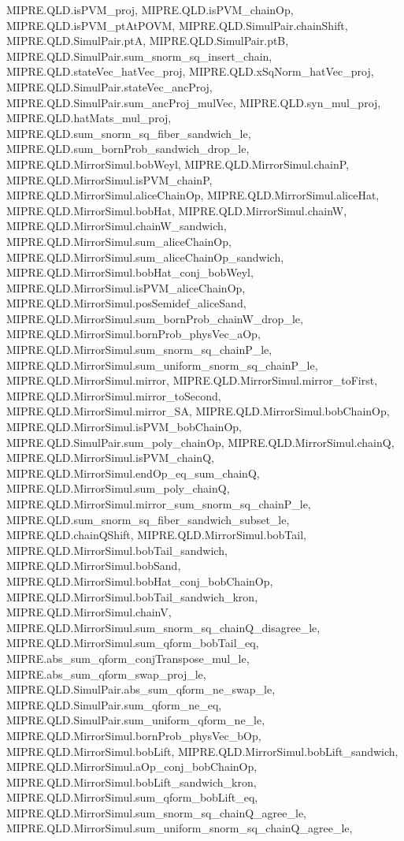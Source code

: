 \begin{lemma}
{  MIPRE.QLD.isPVM_proj, MIPRE.QLD.isPVM_chainOp, MIPRE.QLD.isPVM_ptAtPOVM,
  MIPRE.QLD.SimulPair.chainShift, MIPRE.QLD.SimulPair.ptA, MIPRE.QLD.SimulPair.ptB,
  MIPRE.QLD.SimulPair.sum_snorm_sq_insert_chain, MIPRE.QLD.stateVec_hatVec_proj,
  MIPRE.QLD.xSqNorm_hatVec_proj, MIPRE.QLD.SimulPair.stateVec_ancProj,
  MIPRE.QLD.SimulPair.sum_ancProj_mulVec, MIPRE.QLD.syn_mul_proj, MIPRE.QLD.hatMats_mul_proj,
  MIPRE.QLD.sum_snorm_sq_fiber_sandwich_le, MIPRE.QLD.sum_bornProb_sandwich_drop_le,
  MIPRE.QLD.MirrorSimul.bobWeyl, MIPRE.QLD.MirrorSimul.chainP, MIPRE.QLD.MirrorSimul.isPVM_chainP,
  MIPRE.QLD.MirrorSimul.aliceChainOp, MIPRE.QLD.MirrorSimul.aliceHat, MIPRE.QLD.MirrorSimul.bobHat,
  MIPRE.QLD.MirrorSimul.chainW, MIPRE.QLD.MirrorSimul.chainW_sandwich,
  MIPRE.QLD.MirrorSimul.sum_aliceChainOp, MIPRE.QLD.MirrorSimul.sum_aliceChainOp_sandwich,
  MIPRE.QLD.MirrorSimul.bobHat_conj_bobWeyl, MIPRE.QLD.MirrorSimul.isPVM_aliceChainOp,
  MIPRE.QLD.MirrorSimul.posSemidef_aliceSand, MIPRE.QLD.MirrorSimul.sum_bornProb_chainW_drop_le,
  MIPRE.QLD.MirrorSimul.bornProb_physVec_aOp, MIPRE.QLD.MirrorSimul.sum_snorm_sq_chainP_le,
  MIPRE.QLD.MirrorSimul.sum_uniform_snorm_sq_chainP_le, MIPRE.QLD.MirrorSimul.mirror,
  MIPRE.QLD.MirrorSimul.mirror_toFirst, MIPRE.QLD.MirrorSimul.mirror_toSecond,
  MIPRE.QLD.MirrorSimul.mirror_SA, MIPRE.QLD.MirrorSimul.bobChainOp,
  MIPRE.QLD.MirrorSimul.isPVM_bobChainOp, MIPRE.QLD.SimulPair.sum_poly_chainOp,
  MIPRE.QLD.MirrorSimul.chainQ, MIPRE.QLD.MirrorSimul.isPVM_chainQ,
  MIPRE.QLD.MirrorSimul.endOp_eq_sum_chainQ, MIPRE.QLD.MirrorSimul.sum_poly_chainQ,
  MIPRE.QLD.MirrorSimul.mirror_sum_snorm_sq_chainP_le,
  MIPRE.QLD.sum_snorm_sq_fiber_sandwich_subset_le, MIPRE.QLD.chainQShift,
  MIPRE.QLD.MirrorSimul.bobTail, MIPRE.QLD.MirrorSimul.bobTail_sandwich,
  MIPRE.QLD.MirrorSimul.bobSand, MIPRE.QLD.MirrorSimul.bobHat_conj_bobChainOp,
  MIPRE.QLD.MirrorSimul.bobTail_sandwich_kron, MIPRE.QLD.MirrorSimul.chainV,
  MIPRE.QLD.MirrorSimul.sum_snorm_sq_chainQ_disagree_le, MIPRE.QLD.MirrorSimul.sum_qform_bobTail_eq,
  MIPRE.abs_sum_qform_conjTranspose_mul_le, MIPRE.abs_sum_qform_swap_proj_le,
  MIPRE.QLD.SimulPair.abs_sum_qform_ne_swap_le, MIPRE.QLD.SimulPair.sum_qform_ne_eq,
  MIPRE.QLD.SimulPair.sum_uniform_qform_ne_le, MIPRE.QLD.MirrorSimul.bornProb_physVec_bOp,
  MIPRE.QLD.MirrorSimul.bobLift, MIPRE.QLD.MirrorSimul.bobLift_sandwich,
  MIPRE.QLD.MirrorSimul.aOp_conj_bobChainOp, MIPRE.QLD.MirrorSimul.bobLift_sandwich_kron,
  MIPRE.QLD.MirrorSimul.sum_qform_bobLift_eq, MIPRE.QLD.MirrorSimul.sum_snorm_sq_chainQ_agree_le,
  MIPRE.QLD.MirrorSimul.sum_uniform_snorm_sq_chainQ_agree_le,
}
\end{lemma}
